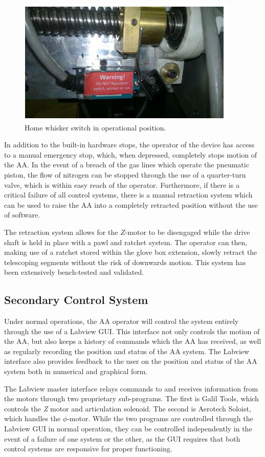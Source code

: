 	\begin{figure}
	\includegraphics[width =.5 \textwidth]{AA/Whisker.jpg}
	\caption{Home whisker switch in operational position.}
	\label{Whisker}
	\end{figure}
	
	In addition to the built-in hardware stops, the operator of the device has access to a manual emergency stop, which, when depressed, completely stops motion of the AA. In the event of a breach of the gas lines which operate the pneumatic piston, the flow of nitrogen can be stopped through the use of a quarter-turn valve, which is within easy reach of the operator. Furthermore, if there is a critical failure of all control systems, there is a manual retraction system which can be used to raise the AA into a completely retracted position without the use of software. 
	
	The retraction system allows for the $Z$-motor to be disengaged while the drive shaft is held in place with a pawl and ratchet system. The operator can then, making use of a ratchet stored within the glove box extension, slowly retract the telescoping segments without the risk of downwards motion. This system has been extensively bench-tested and validated. 
	
\subsection{Secondary Control System}
	\label{Software}
	Under normal operations, the AA operator will control the system entirely through the use of a Labview GUI. This interface not only controls the motion of the AA, but also keeps a history of commands which the AA has received, as well as regularly recording the position and status of the AA system. The Labview interface also provides feedback to the user on the position and status of the AA system both in numerical and graphical form. 
	
	
	 The Labview master interface relays commands to and receives information from the motors through two proprietary sub-programs. The first is Galil Tools, which controls the \emph{Z} motor and articulation solenoid. The second is Aerotech Soloist, which handles the $\phi$-motor. While the two programs are controlled through the Labview GUI in normal operation, they can be controlled independently in the event of a failure of one system or the other, as the GUI requires that both control systems are responsive for proper functioning. 
	 
